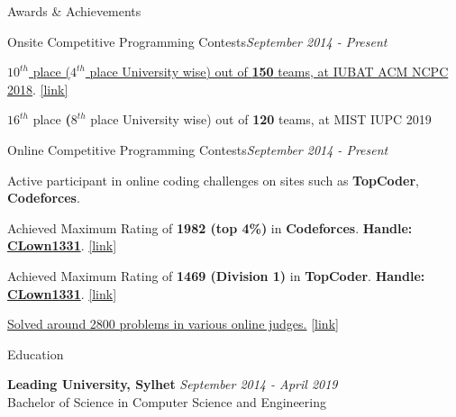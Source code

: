 \documentclass{resume}
\begin{document}
\begin{rSection}{Awards \& Achievements} 

\begin{rSubsection}{Onsite Competitive Programming Contests}{\em September 2014 - Present}{}{}{}
\item \href{https://icpc.baylor.edu/ICPCID/DII3NHEO8O8I}{\textbf{$10^{th}$} place (\textbf{$4^{th}$} place University wise) out of \textbf{150} teams, at IUBAT ACM NCPC 2018}. \href{https://icpc.baylor.edu/ICPCID/DII3NHEO8O8I}{[link]}
\item \textbf{$16^{th}$} place \textbf(\textbf{$8^{th}$} place University wise) out of \textbf{120} teams, at MIST IUPC 2019
\end{rSubsection}

\begin{rSubsection}{Online Competitive Programming Contests}{\em September 2014 - Present}{}{}{}
\item Active participant in online coding challenges on sites such as \textbf{TopCoder}, \textbf{Codeforces}.
\item Achieved Maximum Rating of \textbf{1982 (top 4\%)} in \textbf{Codeforces}. \textbf{Handle:} \textbf{\href{http://codeforces.com/profile/CLown1331}{CLown1331}}. \href{http://codeforces.com/profile/CLown1331}{[link]}
\item Achieved Maximum Rating of \textbf{1469 (Division 1)} in \textbf{TopCoder}. \textbf{Handle:} \textbf{\href{https://www.topcoder.com/members/CLown1331/}{CLown1331}}. \href{https://www.topcoder.com/members/CLown1331/}{[link]}
\item \href{https://www.stopstalk.com/user/profile/clown1331}{Solved around 2800 problems in various online judges.} \href{https://www.stopstalk.com/user/profile/clown1331}{[link]}
\end{rSubsection}

\end{rSection}


\begin{rSection}{Education}

{\bf Leading University, Sylhet} \hfill {\em September 2014 - April 2019}
\\ Bachelor of Science in Computer Science and Engineering
\end{rSection}
\end{document}

